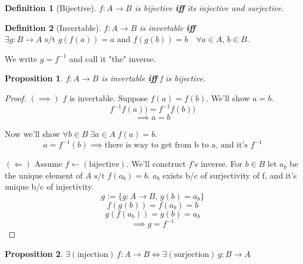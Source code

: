 \documentclass[12pt]{report}
\theoremstyle{theoremdd}
\newtheorem{defn}{Definition}[section]
\newtheorem{prop}{Proposition}[section]
\newcommand{\bbox}{\begin{tcolorbox}[colback=blue!20!white,colframe=blue]}
\newcommand{\ebox}{\end{tcolorbox}}
\newcommand{\T}[1]{\text{#1}}
\newcommand{\TB}[1]{\textbf{#1}}
\newcommand{\st}{\T{ s/t }}
\newcommand{\ot}{\leftarrow}
\newcommand{\limplies}{\Longleftarrow}
\newcommand{\is}{\ot}
\begin{document}
\bbox
\begin{defn}[Bijective]
  \(f:A\to B\) is bijective \TB{iff} its injective and surjective.
\end{defn}
\ebox


\bbox
\begin{defn}[Invertable]
  \(f:A\to B\) is invertable \TB{iff} \(\exists g:B\to A\st g(f(a))=a\T{ and }
  f(g(b))=b\quad\forall a\in A,\,b\in B\).
\end{defn}
\ebox
We write \(g=f^{-1}\) and call it "the" inverse.


\bbox
\begin{prop}
  \(f:A\to B\) is invertable \TB{iff} f is bijective.
\end{prop}
\ebox

\begin{proof}
  \((\implies)\) \(f\) is invertable. Suppose \(f(a)=f(b)\). We'll show \(a=b\).
  \[f^{-1}f(a))=f^{-1}f(b))\]
  \[\implies a=b\]
  
  Now we'll show \(\forall b\in B\;\exists a\in A\;f(a)=b\).
  \[a=f^{-1}(b)\implies\T{there is way to get from b to a, and it's }f^{-1}\]

  \((\limplies)\) Assume \(f\is(\T{bijective})\). We'll construct \(f\)'s
  inverse. For \(b\in B\) let \(a_b\) be the unique element of \(A\st f(a_b)=b\).
  \(a_b\) exists b/c of surjectivity of f, and it's unique b/c of injectivity.
  \[g:=\{g:A\to B,\,g(b)=a_b\}\]
  \[f(g(b))=f(a_b)=b\]
  \[g(f(a_b))=g(b)=a_b\]
  \[\implies g=f^{-1}\]
\end{proof}

\bbox
\begin{prop}
  \(\exists(\T{injection})\,f:A\to B\iff\exists(\T{surjection})\,g:B\to A\)
\end{prop}
\ebox
\end{document}
